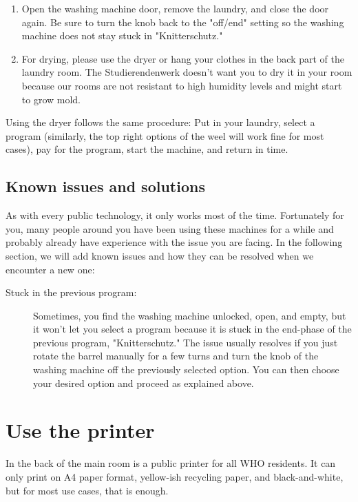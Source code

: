 \begin{enumerate}
    \item Open the washing machine door, remove the laundry, and close the door again. Be sure to turn the knob back to the "off/end" setting so the washing machine does not stay stuck in "Knitterschutz."

    \item For drying, please use the dryer or hang your clothes in the back part of the laundry room. The Studierendenwerk doesn't want you to dry it in your room because our rooms are not resistant to high humidity levels and might start to grow mold.
\end{enumerate}

Using the dryer follows the same procedure: Put in your laundry, select a program (similarly, the top right options of the weel will work fine for most cases), pay for the program, start the machine, and return in time.

\subsection{Known issues and solutions}
As with every public technology, it only works most of the time. Fortunately for you, many people around you have been using these machines for a while and probably already have experience with the issue you are facing. In the following section, we will add known issues and how they can be resolved when we encounter a new one:
\begin{description}
    \item[Stuck in the previous program:] Sometimes, you find the washing machine unlocked, open, and empty, but it won't let you select a program because it is stuck in the end-phase of the previous program, "Knitterschutz." The issue usually resolves if you just rotate the barrel manually for a few turns and turn the knob of the washing machine off the previously selected option. You can then choose your desired option and proceed as explained above.
\end{description}

\section{Use the printer}
In the back of the main room is a public printer for all WHO residents. It can only print on A4 paper format, yellow-ish recycling paper, and black-and-white, but for most use cases, that is enough.

